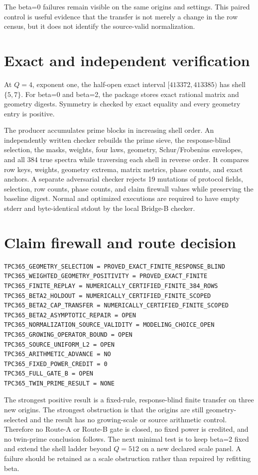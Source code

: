 \documentclass[10pt]{article}
\begin{document}
The beta=0 failures remain visible on the same origins and settings.  This
paired control is useful evidence that the transfer is not merely a change
in the row census, but it does not identify the source-valid normalization.

\section{Exact and independent verification}

At $Q=4$, exponent one, the half-open exact interval
$[413372,413385)$ has shell $\{5,7\}$.  For beta=0 and beta=2, the package
stores exact rational matrix and geometry digests.  Symmetry is checked by
exact equality and every geometry entry is positive.

The producer accumulates prime blocks in increasing shell order.  An
independently written checker rebuilds the prime sieve, the response-blind
selection, the masks, weights, four laws, geometry, Schur/Frobenius
envelopes, and all 384 true spectra while traversing each shell in reverse
order.  It compares row keys, weights, geometry extrema, matrix metrics,
phase counts, and exact anchors.  A separate adversarial checker rejects 19
mutations of protocol fields, selection, row counts, phase counts, and claim
firewall values while preserving the baseline digest.  Normal and optimized
executions are required to have empty stderr and byte-identical stdout by
the local Bridge-B checker.

\section{Claim firewall and route decision}

\begin{verbatim}
TPC365_GEOMETRY_SELECTION = PROVED_EXACT_FINITE_RESPONSE_BLIND
TPC365_WEIGHTED_GEOMETRY_POSITIVITY = PROVED_EXACT_FINITE
TPC365_FINITE_REPLAY = NUMERICALLY_CERTIFIED_FINITE_384_ROWS
TPC365_BETA2_HOLDOUT = NUMERICALLY_CERTIFIED_FINITE_SCOPED
TPC365_BETA2_CAP_TRANSFER = NUMERICALLY_CERTIFIED_FINITE_SCOPED
TPC365_BETA2_ASYMPTOTIC_REPAIR = OPEN
TPC365_NORMALIZATION_SOURCE_VALIDITY = MODELING_CHOICE_OPEN
TPC365_GROWING_OPERATOR_BOUND = OPEN
TPC365_SOURCE_UNIFORM_L2 = OPEN
TPC365_ARITHMETIC_ADVANCE = NO
TPC365_FIXED_POWER_CREDIT = 0
TPC365_FULL_GATE_B = OPEN
TPC365_TWIN_PRIME_RESULT = NONE
\end{verbatim}

The strongest positive result is a fixed-rule, response-blind finite transfer
on three new origins.  The strongest obstruction is that the origins are
still geometry-selected and the result has no growing-scale or source
arithmetic control.  Therefore no Route-A or Route-B gate is closed, no
fixed power is credited, and no twin-prime conclusion follows.  The next
minimal test is to keep beta=2 fixed and extend the shell ladder beyond
$Q=512$ on a new declared scale panel.  A failure should be retained as a
scale obstruction rather than repaired by refitting beta.
\end{document}
